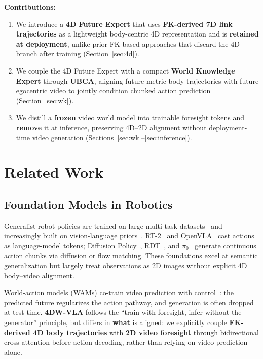 \documentclass[journal]{IEEEtran}
\begin{document}
\textbf{Contributions:}
\begin{enumerate}
\item We introduce a \textbf{4D Future Expert} that uses
  \textbf{FK-derived 7D link trajectories} as a lightweight body-centric
  4D representation and is \textbf{retained at deployment}, unlike prior
  FK-based approaches that discard the 4D branch after training
  (Section~\ref{sec:4d}).
\item We couple the 4D Future Expert with a compact \textbf{World
  Knowledge Expert} through \textbf{UBCA}, aligning future metric body
  trajectories with future egocentric video to jointly condition chunked
  action prediction (Section~\ref{sec:wk}).
\item We distill a \textbf{frozen} video world model into trainable
  foresight tokens and \textbf{remove} it at inference, preserving
  4D--2D alignment without deployment-time video generation
  (Sections~\ref{sec:wk}--\ref{sec:inference}).
\end{enumerate}

\section{Related Work}
\label{sec:related}

\subsection{Foundation Models in Robotics}

Generalist robot policies are trained on large multi-task
datasets~\cite{walke2023bridge,khazatsky2024droid,vuong2023oxe} and
increasingly built on vision-language
priors~\cite{rt2,kim2024openvla,black2024pi0,liu2024rdt}. RT-2~\cite{rt2}
and OpenVLA~\cite{kim2024openvla} cast actions as language-model tokens;
Diffusion Policy~\cite{chi2023diffusion}, RDT~\cite{liu2024rdt}, and
$\pi_0$~\cite{black2024pi0} generate continuous action chunks via
diffusion or flow matching. These foundations excel at semantic
generalization but largely treat observations as 2D images without
explicit 4D body--video alignment.

World-action models (WAMs) co-train video prediction with
control~\cite{nvidia2026wam,lawam2026,dreaming2026}: the predicted future
regularizes the action pathway, and generation is often dropped at test
time. \textbf{4DW-VLA} follows the ``train with foresight, infer without
the generator'' principle, but differs in \textbf{what} is aligned: we
explicitly couple \textbf{FK-derived 4D body trajectories} with
\textbf{2D video foresight} through bidirectional cross-attention before
action decoding, rather than relying on video prediction alone.
\end{document}
